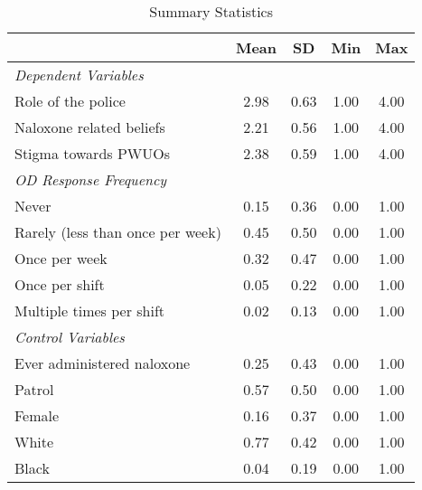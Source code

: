 \begin{table}[htbp]\centering
\def\sym#1{\ifmmode^{#1}\else\(^{#1}\)\fi}
\caption{\centering Summary Statistics}
\begin{tabular}{l*{1}{cccc}}
\hline\hline
                &     Mean&       SD&      Min&      Max\\
\hline
\emph{Dependent Variables}&         &         &         &         \\
\hspace{0.25cm} Role of the police&     2.98&     0.63&     1.00&     4.00\\
\hspace{0.25cm} Naloxone related beliefs&     2.21&     0.56&     1.00&     4.00\\
\hspace{0.25cm} Stigma towards PWUOs&     2.38&     0.59&     1.00&     4.00\\
\emph{OD Response Frequency}&         &         &         &         \\
\hspace{0.25cm} Never&     0.15&     0.36&     0.00&     1.00\\
\hspace{0.25cm} Rarely (less than once per week)&     0.45&     0.50&     0.00&     1.00\\
\hspace{0.25cm} Once per week&     0.32&     0.47&     0.00&     1.00\\
\hspace{0.25cm} Once per shift&     0.05&     0.22&     0.00&     1.00\\
\hspace{0.25cm} Multiple times per shift&     0.02&     0.13&     0.00&     1.00\\
\vspace{0.1em} \emph{Control Variables}&         &         &         &         \\
\hspace{0.25cm} Ever administered naloxone&     0.25&     0.43&     0.00&     1.00\\
\hspace{0.25cm} Patrol&     0.57&     0.50&     0.00&     1.00\\
\hspace{0.25cm} Female&     0.16&     0.37&     0.00&     1.00\\
\hspace{0.25cm} White&     0.77&     0.42&     0.00&     1.00\\
\hspace{0.25cm} Black&     0.04&     0.19&     0.00&     1.00\\

\end{tabular}
\end{table}
